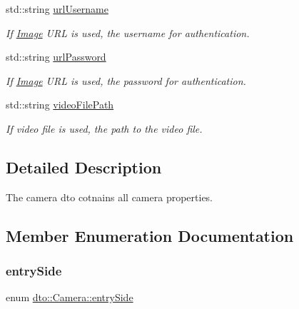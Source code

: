 \begin{DoxyCompactItemize}
\mbox{\label{structdto_1_1_camera_a533938bcd86cadab8e33ddd7d542e7e7}} 
std\+::string \mbox{\hyperlink{structdto_1_1_camera_a533938bcd86cadab8e33ddd7d542e7e7}{url\+Username}}
\begin{DoxyCompactList}\small\item\em If \mbox{\hyperlink{structdto_1_1_image}{Image}} U\+RL is used, the username for authentication. \end{DoxyCompactList}\item 
\mbox{\label{structdto_1_1_camera_a2336ad2a9eace8463108fce54414a72d}} 
std\+::string \mbox{\hyperlink{structdto_1_1_camera_a2336ad2a9eace8463108fce54414a72d}{url\+Password}}
\begin{DoxyCompactList}\small\item\em If \mbox{\hyperlink{structdto_1_1_image}{Image}} U\+RL is used, the password for authentication. \end{DoxyCompactList}\item 
\mbox{\label{structdto_1_1_camera_a4aee0d7218f8721665bc3de7ae5531a5}} 
std\+::string \mbox{\hyperlink{structdto_1_1_camera_a4aee0d7218f8721665bc3de7ae5531a5}{video\+File\+Path}}
\begin{DoxyCompactList}\small\item\em If video file is used, the path to the video file. \end{DoxyCompactList}\end{DoxyCompactItemize}


\subsection{Detailed Description}
The camera dto cotnains all camera properties. 

\subsection{Member Enumeration Documentation}
\mbox{\label{structdto_1_1_camera_a6f7db1fcd253e1a84a7e9ac2ffdfa525}} 
\subsubsection{\texorpdfstring{entry\+Side}{entrySide}}
{\footnotesize\ttfamily enum \mbox{\hyperlink{structdto_1_1_camera_a6f7db1fcd253e1a84a7e9ac2ffdfa525}{dto\+::\+Camera\+::entry\+Side}}}



